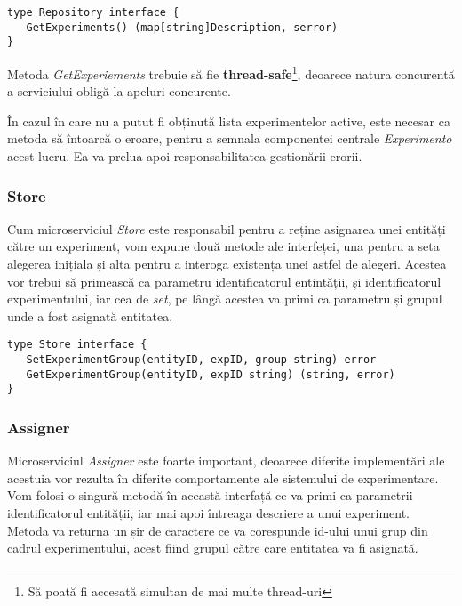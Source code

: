 \begin{center}
	\begin{lstlisting}[language=Golang]
type Repository interface {
   GetExperiments() (map[string]Description, serror)
}
	\end{lstlisting}
\end{center}

\begin{remark}
	Metoda \textit{GetExperiements} trebuie să fie \textbf{thread-safe}\footnote{Să poată fi accesată simultan de mai multe thread-uri}, deoarece natura concurentă a serviciului obligă la apeluri concurente.
\end{remark}

În cazul în care nu a putut fi obținută lista experimentelor active, este necesar ca metoda să întoarcă o eroare, pentru a semnala componentei centrale \textit{Experimento} acest lucru. Ea va prelua apoi responsabilitatea gestionării erorii.

\subsubsection{Store}

Cum microserviciul \textit{Store} este responsabil pentru a reține asignarea unei entități către un experiment, vom expune două metode ale interfeței, una pentru a seta alegerea inițiala și alta pentru a interoga existența unei astfel de alegeri. Acestea vor trebui să primească ca parametru identificatorul entintății, și identificatorul experimentului, iar cea de \textit{set}, pe lângă acestea va primi ca parametru și grupul unde a fost asignată entitatea.

\begin{center}
	\begin{lstlisting}[language=Golang]
type Store interface {
   SetExperimentGroup(entityID, expID, group string) error
   GetExperimentGroup(entityID, expID string) (string, error)
}
	\end{lstlisting}
\end{center}

\subsubsection{Assigner}

Microserviciul \textit{Assigner} este foarte important, deoarece diferite implementări ale acestuia vor rezulta în diferite comportamente ale sistemului de experimentare. Vom folosi o singură metodă în această interfață ce va primi ca parametrii identificatorul entității, iar mai apoi întreaga descriere a unui experiment. Metoda va returna un șir de caractere ce va corespunde id-ului unui grup din cadrul experimentului, acest fiind grupul către care entitatea va fi asignată.

